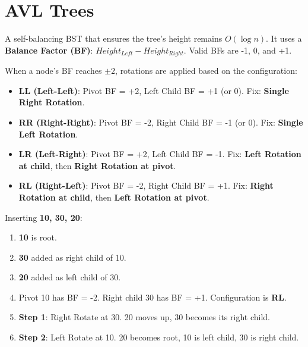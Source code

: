 \section{AVL Trees}

\begin{definition}
A self-balancing BST that ensures the tree's height remains $O(\log n)$. It uses a \textbf{Balance Factor (BF)}: $Height_{Left} - Height_{Right}$. Valid BFs are -1, 0, and +1.
\end{definition}

\begin{definition}
When a node's BF reaches $\pm 2$, rotations are applied based on the configuration:
\begin{itemize}
    \item \textbf{LL (Left-Left)}: Pivot BF = +2, Left Child BF = +1 (or 0). Fix: \textbf{Single Right Rotation}.
    \item \textbf{RR (Right-Right)}: Pivot BF = -2, Right Child BF = -1 (or 0). Fix: \textbf{Single Left Rotation}.
    \item \textbf{LR (Left-Right)}: Pivot BF = +2, Left Child BF = -1. Fix: \textbf{Left Rotation at child}, then \textbf{Right Rotation at pivot}.
    \item \textbf{RL (Right-Left)}: Pivot BF = -2, Right Child BF = +1. Fix: \textbf{Right Rotation at child}, then \textbf{Left Rotation at pivot}.
\end{itemize}
\end{definition}

\begin{example}
Inserting \textbf{10, 30, 20}:
\begin{enumerate}
    \item \textbf{10} is root.
    \item \textbf{30} added as right child of 10.
    \item \textbf{20} added as left child of 30.
    \item Pivot 10 has BF = -2. Right child 30 has BF = +1. Configuration is \textbf{RL}.
    \item \textbf{Step 1}: Right Rotate at 30. 20 moves up, 30 becomes its right child.
    \item \textbf{Step 2}: Left Rotate at 10. 20 becomes root, 10 is left child, 30 is right child.
\end{enumerate}
\end{example}

